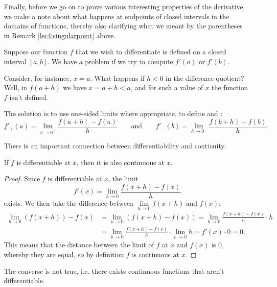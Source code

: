 Finally, before we go on to prove various interesting properties of the derivative, we make a note about what happens at endpoints of closed intervals in the domains of functions, thereby also clarifying what we meant by the parentheses in Remark \ref{lec4:singularpoint} above.

\begin{remark}
	Suppose our function $f$ that we wish to differentiate is defined on a closed interval $[a, b]$.
	We have a problem if we try to compute $f'(a)$ or $f'(b)$.

	Consider, for instance, $x = a$.
	What happens if $h < 0$ in the difference quotient?
	Well, in $f(a + h)$ we have $x = a + h < a$, and for such a value of $x$ the function $f$ isn't defined.

	The solution is to use one-sided limits where appropriate, to define  and :
	\[
		f'_+(a) = \lim_{h \to 0^+} \frac{f(a + h) - f(a)}{h} \qquad \text{and} \qquad f'_- (b) = \lim_{h \to 0^-} \frac{f(b + h) - f(b)}{h}.
	\]
\end{remark}

\noindent
There is an important connection between differentiability and continuity.

\begin{theorem}\label{lec4:diffimpliescont}
	If $f$ is differentiable at $x$, then it is also continuous at $x$.
\end{theorem}

\begin{proof}
	Since $f$ is differentiable at $x$, the limit
	\[
		f'(x) = \lim_{h \to 0} \frac{f(x + h) - f(x)}{h}
	\]
	exists. We then take the difference between $\lim\limits_{h \to 0} f(x + h)$ and $f(x)$:
	\begin{align*}
		\lim\limits_{h \to 0} (f(x + h)) - f(x) & = \lim_{h \to 0} (f(x + h) - f(x)) = \lim_{h \to 0} \frac{f(x + h) - f(x)}{h} \cdot h  \\
		                                        & = \lim_{h \to 0} \frac{f(x + h) - f(x)}{h} \cdot \lim_{h \to 0} h = f'(x) \cdot 0 = 0.
	\end{align*}
	This means that the distance between the limit of $f$ at $x$ and $f(x)$ is 0, whereby they are equal, so by definition $f$ is continuous at $x$.
\end{proof}

\noindent
The converse is not true, i.e. there exists continuous functions that aren't differentiable.

